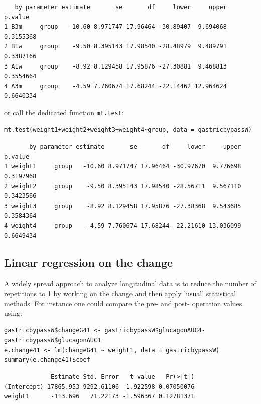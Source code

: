 \documentclass[12pt]{article}
\begin{document}
\begin{verbatim}
   by parameter estimate       se       df     lower     upper   p.value
1 B3m     group   -10.60 8.971747 17.96464 -30.89407  9.694068 0.3155368
2 B1w     group    -9.50 8.395143 17.98540 -28.48979  9.489791 0.3387166
3 A1w     group    -8.92 8.129458 17.95876 -27.30881  9.468813 0.3554664
4 A3m     group    -4.59 7.760674 17.68244 -22.14462 12.964624 0.6640334
\end{verbatim}


or call the dedicated function \texttt{mt.test}:
\lstset{language=r,label= ,caption= ,captionpos=b,numbers=none}
\begin{lstlisting}
mt.test(weight1+weight2+weight3+weight4~group, data = gastricbypassW)
\end{lstlisting}

\begin{verbatim}
       by parameter estimate       se       df     lower     upper   p.value
1 weight1     group   -10.60 8.971747 17.96464 -30.97670  9.776698 0.3197968
2 weight2     group    -9.50 8.395143 17.98540 -28.56711  9.567110 0.3423566
3 weight3     group    -8.92 8.129458 17.95876 -27.38368  9.543685 0.3584364
4 weight4     group    -4.59 7.760674 17.68244 -22.21610 13.036099 0.6649434
\end{verbatim}

\subsection{Linear regression on the change}
\label{sec:orgb48e702}

A widely spread approach to analyze longitudinal data is to reduce the
number of repetitions to 1 by working on the change and then apply
'usual' statistical methods. For instance one could compare the pre-
and post- operation values using:

\lstset{language=r,label= ,caption= ,captionpos=b,numbers=none}
\begin{lstlisting}
gastricbypassW$changeG41 <- gastricbypassW$glucagonAUC4-gastricbypassW$glucagonAUC1
e.change41 <- lm(changeG41 ~ weight1, data = gastricbypassW)
summary(e.change41)$coef
\end{lstlisting}

\begin{verbatim}
             Estimate Std. Error   t value   Pr(>|t|)
(Intercept) 17865.953 9292.61106  1.922598 0.07050076
weight1      -113.696   71.22173 -1.596367 0.12781371
\end{verbatim}
\end{document}
